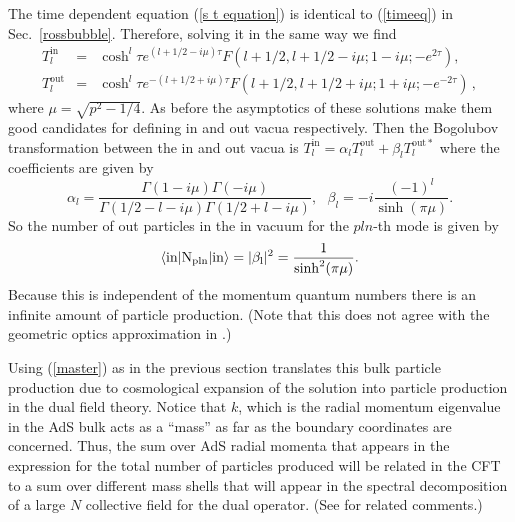 \documentclass[a4paper,aps,prd,preprintnumbers,groupedaddress]{revtex4}
\begin{document}
The time dependent equation (\ref{s t equation}) is identical to (\ref{timeeq}) in Sec.~\ref{rossbubble}.   Therefore, solving it in the same way we find
\begin{eqnarray}
T_l ^{\mathrm{in}} &=&  \cosh ^l \tau e^{(l+1/2 - i \mu) \tau} F(l+1/2, l+1/2-i \mu; 1-i\mu ; - e^{2 \tau} ) ,
\label{s in solution} \\
T_l ^{\mathrm{{out}}} &=&  \cosh ^l \tau e^{-(l+1/2 + i \mu) \tau} F(l+1/2, l+1/2+i \mu; 1+i\mu ; - e^{-2 \tau} ) \, ,
\label{s out solution}
\end{eqnarray}
where $\mu=\sqrt{p^2-1/4}$. As before the asymptotics of these solutions make them good candidates for defining in and out vacua
respectively. Then the Bogolubov transformation between the in and out vacua is $T^{\mathrm{in}} _l   = \alpha_l T^{\mathrm{{out}}} _l +
\beta_l T^{\mathrm{{out}}*} _l$ where the coefficients are given by
\begin{equation}
\alpha_l= \frac{\Gamma(1-i\mu)\Gamma(-i\mu)}{\Gamma(1/2-l-i\mu)\Gamma(1/2+l-i\mu)} , \ \ \ \beta_l=-i \frac{(-1)^l}{\sinh(\pi \mu)} .
\end{equation}
So the number of out particles in the in vacuum for the $pln$-th mode is given by
\begin{equation}
\langle \rm{in}| N_{pln} | \mathrm{\rm{in}} \rangle = |\beta_l|^2 = \frac{1}{\sinh ^2 (\pi \mu) } .
\end{equation}
Because this is independent of the momentum quantum numbers there is an infinite amount of particle production.  (Note that this does not agree with the geometric optics approximation in \cite{silv02}.)

Using (\ref{master}) as in the previous section translates this bulk particle production due to cosmological expansion of the solution into
particle production in the dual field theory.  Notice that $k$, which is the radial momentum eigenvalue in the AdS bulk acts as a ``mass''
as far as the boundary coordinates are concerned.  Thus, the sum over AdS radial momenta that appears in the expression for the total number
of particles produced will be related in the CFT to a sum over different mass shells that will appear in the spectral decomposition of a
large $N$ collective field for the dual operator.  (See \cite{vijay99} for related  comments.)
\end{document}
